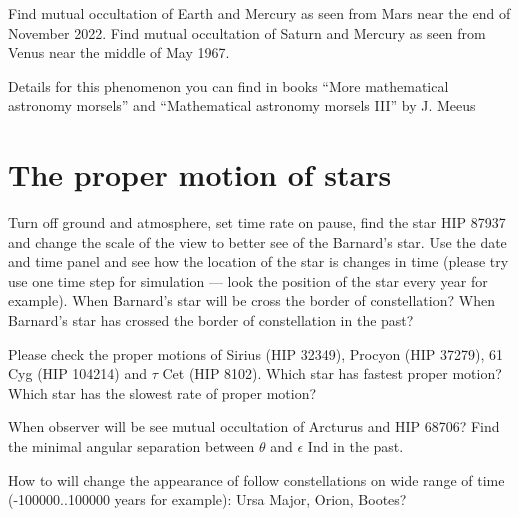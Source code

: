 Find mutual occultation of Earth and Mercury as seen from 
Mars near the end of November 2022. Find mutual occultation 
of Saturn and Mercury as seen from Venus near the middle of 
May 1967.

Details for this 
phenomenon you can find in books ``More mathematical 
astronomy morsels'' and ``Mathematical 
astronomy morsels III'' by J. Meeus~\cite{MeeusMoreAstMorsels, MeeusAstMorselsIII}

\section{The proper motion of stars}
\label{sec:Exercises:ProperMotion}

Turn off ground and atmosphere, set time rate on pause, 
find the star HIP 87937 and change the scale of the view 
to better see of the Barnard's star. Use the date and 
time panel and see how the location of the star is 
changes in time (please try use one time step for 
simulation --- look the position of the star every 
year for example). When Barnard's star will be cross 
the border of constellation? When Barnard's star has 
crossed the border of constellation in the past? 

Please check the proper motions of Sirius (HIP 32349), 
Procyon (HIP 37279), 61 Cyg (HIP 104214) and $\tau$ Cet 
(HIP 8102). Which star has fastest proper motion? Which 
star has the slowest rate of proper motion?

When observer will be see mutual occultation of Arcturus 
and HIP 68706? Find the minimal angular separation 
between $\theta$ and $\epsilon$ Ind in the past.

How to will change the appearance of follow constellations 
on wide range of time (-100000..100000 years for 
example): Ursa Major, Orion, Bootes?

